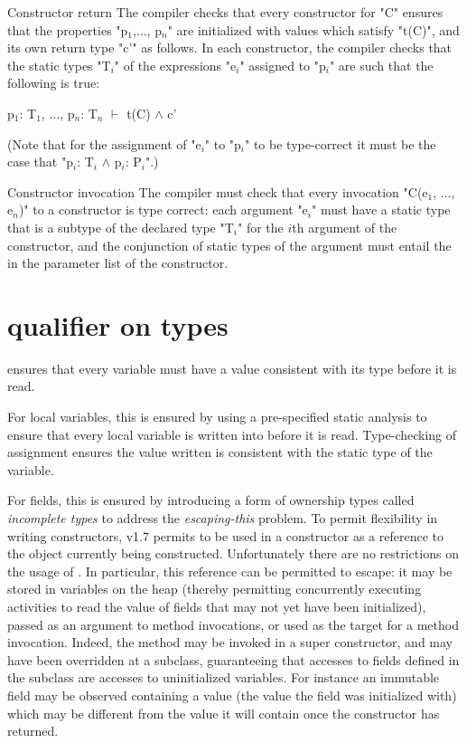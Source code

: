 \begin{staticrule}{Constructor return}
   The compiler checks that every constructor for \xcd"C" ensures that
   the properties \xcdmath"p$_1$,..., p$_n$" are initialized with values which satisfy
   \xcdmath"t(C)", and its own return type \xcd"c'" as follows.  In each constructor, the
   compiler checks that the static types \xcdmath"T$_i$" of the expressions \xcdmath"e$_i$"
   assigned to \xcdmath"p$_i$" are such that the following is
   true:
\begin{xtenmath}
p$_1$: T$_1$, $\dots$, p$_n$: T$_n$ $\vdash$ t(C) $\wedge$ c'     
\end{xtenmath}
\end{staticrule}
(Note that for the assignment of \xcdmath"e$_i$" to \xcdmath"p$_i$"
to be type-correct it must be the
    case that \xcdmath"p$_i$: T$_i$ $\wedge$ p$_i$: P$_i$".) 


\begin{staticrule}{Constructor invocation}
The compiler must check that every invocation \xcdmath"C(e$_1$, $\dots$, e$_n$)" to a
constructor is type correct: each argument \xcdmath"e$_i$" must have a static type
that is a subtype of the declared type \xcdmath"T$_i$" for the $i$th
argument of the
constructor, and the conjunction of static types of the argument must
entail the  in the parameter list of the constructor.
\end{staticrule}

\section{ qualifier on types}
\label{Prototypes}
\Xten{} ensures that every variable must have a value consistent with its type
before it is read.

For local variables, this is ensured by using a pre-specified static
analysis to ensure that every local variable is written into before it
is read. Type-checking of assignment ensures the value written is
consistent with the static type of the variable.

For fields, this is ensured by introducing a form of ownership types
called {\em incomplete types} to address the {\em escaping-this}
problem.  To permit flexibility in writing constructors, \Xten{} v1.7
permits  to be used in a constructor as a reference to the
object currently being constructed. Unfortunately there are no
restrictions on the usage of . In particular, this reference
can be permitted to escape: it may be stored in variables on the heap
(thereby permitting concurrently executing activities to read the
value of fields that may not yet have been initialized), passed as an
argument to method invocations, or used as the target for a method
invocation. Indeed, the method may be invoked in a super constructor,
and may have been overridden at a subclass, guaranteeing that accesses
to fields defined in the subclass are accesses to uninitialized
variables. For instance an immutable field may be observed containing
a value (the value the field was initialized with) which may be
different from the value it will contain once the constructor has
returned.

